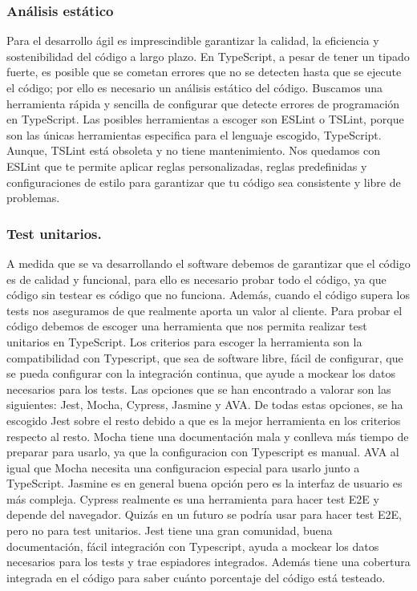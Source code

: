 \subsubsection{Análisis estático}
Para el desarrollo ágil es imprescindible garantizar la calidad, la eficiencia y sostenibilidad del código a largo plazo.
En TypeScript, a pesar de tener un tipado fuerte, es posible que se cometan errores que no se detecten hasta que se ejecute el código; por ello es necesario un análisis estático del código.
Buscamos una herramienta rápida y sencilla de configurar que detecte errores de programación en TypeScript.
Las posibles herramientas a escoger son ESLint o TSLint, porque son las únicas herramientas especifica para el lenguaje escogido, TypeScript. Aunque, TSLint está obsoleta y no tiene mantenimiento.
Nos quedamos con ESLint que te permite aplicar reglas personalizadas, reglas predefinidas y configuraciones de estilo para garantizar que tu código sea consistente y libre de problemas.

\subsubsection{Test unitarios.}
A medida que se va desarrollando el software debemos de garantizar que el código es de calidad y funcional, para ello es necesario probar todo el código, ya que código sin
testear es código que no funciona. Además, cuando el código supera los tests nos aseguramos de que realmente aporta un valor al cliente.
Para probar el código debemos de escoger una herramienta que nos permita realizar test unitarios en TypeScript.
Los criterios para escoger la herramienta son la compatibilidad con Typescript, que sea de software libre, fácil de configurar, que se pueda configurar con la integración continua,
que ayude a mockear los datos necesarios para los tests.
Las opciones que se han encontrado a valorar son las siguientes: Jest, Mocha, Cypress, Jasmine y AVA. De todas estas opciones, se ha escogido Jest sobre el resto debido a que es la
mejor herramienta en los criterios respecto al resto. Mocha tiene una documentación mala y conlleva más tiempo de preparar para usarlo, ya que la configuracion con Typescript es manual.
AVA al igual que Mocha necesita una configuracion especial para usarlo junto a TypeScript. Jasmine es en general buena opción pero es la interfaz de usuario es más compleja.
Cypress realmente es una herramienta para hacer test E2E y depende del navegador. Quizás en un futuro se podría usar para hacer test E2E, pero no para test unitarios.
Jest tiene una gran comunidad, buena documentación, fácil integración con Typescript, ayuda a mockear los datos necesarios para los tests y trae espiadores integrados.
Además tiene una cobertura integrada en el código para saber cuánto porcentaje del código está testeado.

